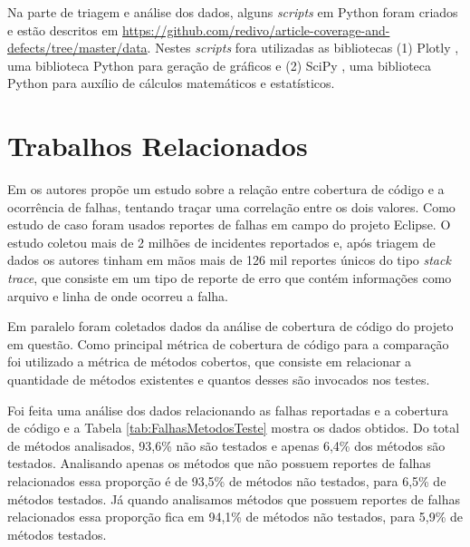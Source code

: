 \documentclass[11.5pt]{article}
\begin{document}
Na parte de triagem e análise dos dados, alguns \textit{scripts} em Python foram criados e estão
descritos em \url{https://github.com/redivo/article-coverage-and-defects/tree/master/data}.
Nestes \textit{scripts} fora utilizadas as bibliotecas
(1) Plotly \cite{plotly}, uma biblioteca Python para geração de gráficos e (2) SciPy \cite{scipy},
uma biblioteca Python para auxílio de cálculos matemáticos e estatísticos.



\section{Trabalhos Relacionados}

Em \cite{unitTestedCrash} os autores propõe um estudo sobre a relação entre cobertura de código
e a ocorrência de falhas, tentando traçar uma correlação entre os dois valores.
Como estudo de caso foram usados reportes de falhas em campo do projeto Eclipse.
O estudo coletou mais de 2 milhões de incidentes reportados e, após triagem de dados os autores
tinham em mãos mais de 126 mil reportes únicos do tipo \textit{stack trace}, que consiste em um tipo
de reporte de erro que contém informações como arquivo e linha de onde ocorreu a falha.

Em paralelo foram coletados dados da análise de cobertura de código do projeto em questão.
Como principal métrica de cobertura de código para a comparação foi utilizado a métrica de métodos
cobertos, que consiste em relacionar a quantidade de métodos existentes e quantos desses são
invocados nos testes.

Foi feita uma análise dos dados relacionando as falhas reportadas e a cobertura de código e a Tabela
\ref{tab:FalhasMetodosTeste} mostra os dados obtidos.
Do total de métodos analisados, 93,6\% não são testados e apenas 6,4\% dos métodos são testados.
Analisando apenas os métodos que não possuem reportes de falhas relacionados essa proporção é de
93,5\% de métodos não testados, para 6,5\% de métodos testados.
Já quando analisamos métodos que possuem reportes de falhas relacionados essa proporção fica em
94,1\% de métodos não testados, para 5,9\% de métodos testados.
\end{document}
